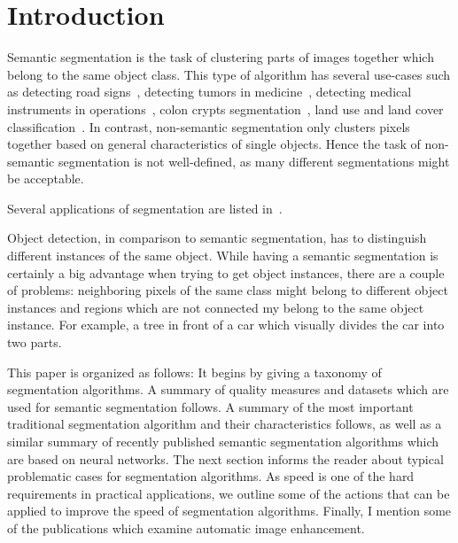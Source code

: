 
\section{Introduction}\label{sec:introduction}
Semantic segmentation is the task of clustering parts of images together which
belong to the same object class. This type of algorithm has several use-cases
such as detecting road signs~\cite{4220659}, detecting tumors in
medicine~\cite{moon2002automatic}, detecting medical instruments in
operations~\cite{wei1997automatic}, colon crypts
segmentation~\cite{cohen2015memory}, land use and land cover
classification~\cite{huang2002assessment}. In contrast, non-semantic
segmentation only clusters pixels together based on general characteristics of
single objects. Hence the task of non-semantic segmentation is not
well-defined, as many different segmentations might be acceptable.

Several applications of segmentation are listed
in~\cite{annurev.bioeng.2.1.315}.

Object detection, in comparison to semantic segmentation, has to distinguish
different instances of the same object. While having a semantic segmentation is
certainly a big advantage when trying to get object instances, there are a
couple of problems: neighboring pixels of the same class might belong to
different object instances and regions which are not connected my belong to the
same object instance. For example, a tree in front of a car which visually
divides the car into two parts.

This paper is organized as follows: It begins by giving a taxonomy of
segmentation algorithms. A summary of quality measures and datasets which are
used for semantic segmentation follows. A summary of the most important
traditional segmentation algorithm and their characteristics follows, as well
as a similar summary of recently published semantic segmentation algorithms
which are based on neural networks. The next section informs the reader about
typical problematic cases for segmentation algorithms. As speed is one of the
hard requirements in practical applications, we outline some of the actions
that can be applied to improve the speed of segmentation algorithms. Finally, I
mention some of the publications which examine automatic image enhancement.
